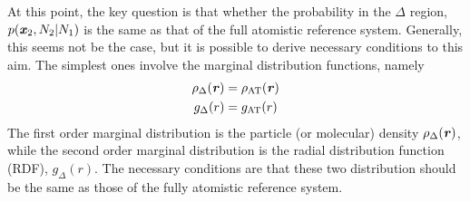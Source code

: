 \documentclass[aip,jcp,a4paper,reprint,onecolumn]{revtex4-1}
\newcommand{\vect}[1]{\textbf{\textit{#1}}}
\newcommand{\AT}{{\textrm{{AT}}}}
\newcommand{\HY}{{\Delta}}
\begin{document}
\noindent
At this point, the key question is that whether the probability in the $\HY$ region, $p(\vect
x_2, N_2 | N_1)$ is the same as that of the full atomistic reference
system. Generally, this seems not be the case, but it is possible to
derive necessary conditions to this aim. The simplest ones involve
the marginal distribution functions, namely
\begin{align}
  \rho_{\HY}(\vect r) &= \rho_{\AT}(\vect r)\\
  g_{\HY}( r) &= g_{\AT}(r)
\end{align}
The first order marginal distribution is the particle (or molecular) density 
$\rho_{\HY}(\vect r)$, while the second order marginal distribution is
the radial distribution function (RDF), $g_{\HY}(r)$. The necessary
conditions are that these two distribution should be the same as those of the fully atomistic reference system.
\end{document}
